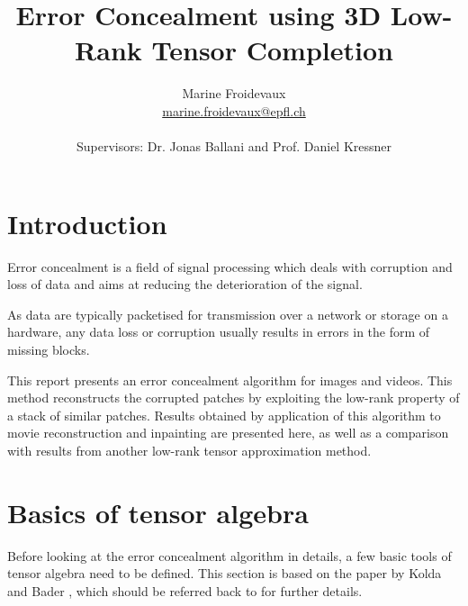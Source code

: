 \documentclass[a4paper, 11pt]{article} %
\newcommand{\mail}[1]{{\href{mailto:#1}{#1}}}
\begin{document}
\title{Error Concealment using 3D Low-Rank Tensor Completion}%
\author{Marine Froidevaux \\ \mail{marine.froidevaux@epfl.ch} \\ \\Supervisors: Dr. Jonas Ballani and Prof. Daniel Kressner 
 }%



\maketitle
%
\thispagestyle{empty}
\setcounter{tocdepth}{2} %
\tableofcontents
\newpage
{}



\section{Introduction}
Error concealment is a field of signal processing which deals with corruption and loss of data and aims at reducing the deterioration of the signal.

As data are typically packetised for transmission over a network  or storage on a hardware, any data loss or corruption usually results in errors in the form of missing blocks.

This report presents an error concealment algorithm for images and videos. This method reconstructs the corrupted patches by exploiting the low-rank property of a stack of similar patches. Results obtained by application of this algorithm to movie reconstruction and inpainting are presented here, as well as a comparison with results from another low-rank tensor approximation method.

\section{Basics of tensor algebra}
Before looking at the error concealment algorithm in details, a few basic tools of tensor algebra need to be defined.
This section is based on the paper by Kolda and Bader \cite{Kolda-Bader}, which should be referred back to for further details.
\end{document}
